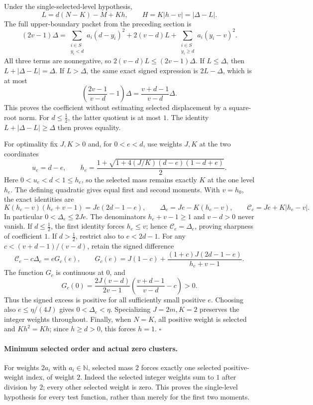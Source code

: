 Under the single-selected-level hypothesis,
\[
 L=d(N-K)-M+Kh,\qquad
 H=K|h-v|=|\Delta-L|.
\]
The full upper-boundary packet from the preceding section is
\[
 (2v-1)\Delta
 =\sum_{\substack{i\in S\\y_i<d}}a_i(d-y_i)^2
       +2(v-d)L
       +\sum_{\substack{i\in S\\y_i\geq d}}a_i(y_i-v)^2.
\]
All three terms are nonnegative, so
\(2(v-d)L\leq(2v-1)\Delta\).
If \(L\leq\Delta\), then \(L+|\Delta-L|=\Delta\).
If \(L>\Delta\), the same exact signed expression is \(2L-\Delta\),
which is at most
\[
 \left(\frac{2v-1}{v-d}-1\right)\Delta
 =\frac{v+d-1}{v-d}\Delta.
\]
This proves the coefficient without estimating selected displacement
by a square-root norm.  For \(d\leq\tfrac12\), the latter quotient
is at most \(1\).  The identity
\(L+|\Delta-L|\geq\Delta\) then proves equality.

For optimality fix \(J,K>0\) and, for \(0<e<d\), use weights \(J,K\)
at the two coordinates
\[
 u_e=d-e,\qquad
 h_e=\frac{1+\sqrt{1+4(J/K)(d-e)(1-d+e)}}2.
\]
Here \(0<u_e<d<1\leq h_e\), so the selected mass remains exactly
\(K\) at the one level \(h_e\).  The defining quadratic gives equal
first and second moments.  With \(v=h_0\), the exact identities are
\[
 K(h_e-v)(h_e+v-1)=Je(2d-1-e),\qquad
 \Delta_e=Je-K(h_e-v),\qquad
 \mathcal C_e=Je+K|h_e-v|.
\]
In particular \(0<\Delta_e\leq2Je\).  The denominators
\(h_e+v-1\geq1\) and \(v-d>0\) never vanish.
If \(d\leq\tfrac12\), the first identity forces \(h_e\leq v\);
hence \(\mathcal C_e=\Delta_e\), proving sharpness of coefficient \(1\).
If \(d>\tfrac12\), restrict also to \(e<2d-1\).  For any
\(c<(v+d-1)/(v-d)\), retain the signed difference
\[
 \mathcal C_e-c\Delta_e=eG_c(e),\qquad
 G_c(e)=J(1-c)+
       \frac{(1+c)J(2d-1-e)}{h_e+v-1}.
\]
The function \(G_c\) is continuous at \(0\), and
\[
 G_c(0)=
 \frac{2J(v-d)}{2v-1}
       \left(\frac{v+d-1}{v-d}-c\right)>0.
\]
Thus the signed excess is positive for all sufficiently small
positive \(e\).  Choosing also \(e\leq\eta/(4J)\) gives
\(0<\Delta_e<\eta\).  Specializing \(J=2m,K=2\) preserves the
integer weights throughout.
Finally, when \(N=K\), all positive weight is selected and
\(Kh^2=Kh\); since \(h\geq d>0\), this forces \(h=1\).
\hfill\(\square\)

\paragraph{Minimum selected order and actual zero clusters.}
For weights \(2a_i\) with \(a_i\in\mathbb N\), selected mass \(2\)
forces exactly one selected positive-weight index, of weight \(2\).
Indeed the selected integer weights sum to \(1\) after division by
\(2\); every other selected weight is zero.  This proves the
single-level hypothesis for every test function, rather than merely
for the first two moments.

